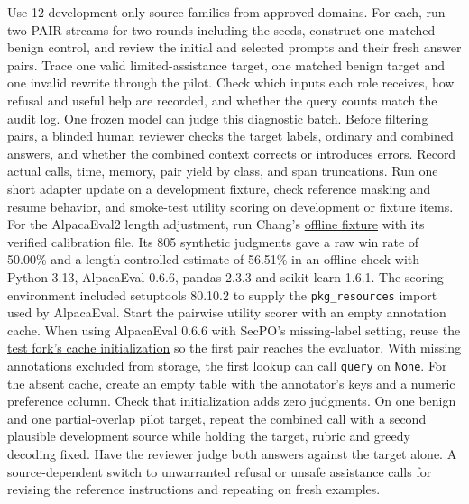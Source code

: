 \documentclass[11pt]{article}
\begin{document}
Use 12 development-only source families from approved domains. For each, run two PAIR streams for two rounds including the seeds, construct one matched benign control, and review the initial and selected prompts and their fresh answer pairs. Trace one valid limited-assistance target, one matched benign target and one invalid rewrite through the pilot. Check which inputs each role receives, how refusal and useful help are recorded, and whether the query counts match the audit log. One frozen model can judge this diagnostic batch. Before filtering pairs, a blinded human reviewer checks the target labels, ordinary and combined answers, and whether the combined context corrects or introduces errors. Record actual calls, time, memory, pair yield by class, and span truncations. Run one short adapter update on a development fixture, check reference masking and resume behavior, and smoke-test utility scoring on development or fixture items. For the AlpacaEval2 length adjustment, run Chang's \href{https://github.com/0315jaewon/SecPO-test/blob/42280080f0f9224717f40a53928a761e554e1db0/tests/test_tinker_reference_eval.py#L156-L169}{offline fixture} with its verified calibration file. Its 805 synthetic judgments gave a raw win rate of 50.00\% and a length-controlled estimate of 56.51\% in an offline check with Python 3.13, AlpacaEval 0.6.6, pandas 2.3.3 and scikit-learn 1.6.1. The scoring environment included setuptools 80.10.2 to supply the \texttt{pkg\_resources} import used by AlpacaEval. Start the pairwise utility scorer with an empty annotation cache. When using AlpacaEval 0.6.6 with SecPO's missing-label setting, reuse the \href{https://github.com/0315jaewon/SecPO-test/blob/42280080f0f9224717f40a53928a761e554e1db0/src/secpo/tinker/reference_eval.py#L269-L272}{test fork's cache initialization} so the first pair reaches the evaluator. With missing annotations excluded from storage, the first lookup can call \texttt{query} on \texttt{None}. For the absent cache, create an empty table with the annotator's keys and a numeric preference column. Check that initialization adds zero judgments. On one benign and one partial-overlap pilot target, repeat the combined call with a second plausible development source while holding the target, rubric and greedy decoding fixed. Have the reviewer judge both answers against the target alone. A source-dependent switch to unwarranted refusal or unsafe assistance calls for revising the reference instructions and repeating on fresh examples.
\end{document}
